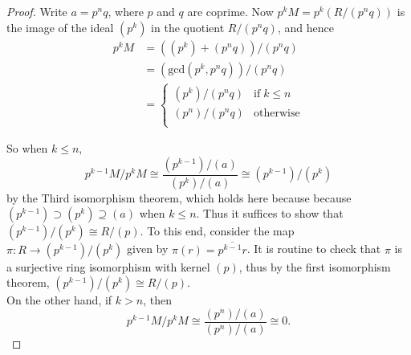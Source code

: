 \documentclass{article}
\begin{document}
  \begin{proof}
    Write $a=p^nq$, where $p$ and $q$ are coprime. Now
    $p^kM=p^k(R/(p^nq))$ is the image of the ideal $(p^k)$ in the quotient
    $R/(p^nq)$, and hence
    \begin{align*}
      p^kM &=((p^k)+(p^nq))/(p^nq)\\
      &=(\text{gcd}(p^k,p^nq))/(p^nq)\\
      &=
      \begin{cases}
        (p^k)/(p^nq) &\text{if}\; k\leq n\\
        (p^n)/(p^nq) &\text{otherwise}\\
      \end{cases}
    \end{align*}

    So when $k\leq n$,
    \[p^{k-1}M/p^kM \cong\frac{(p^{k-1})/(a)}{(p^k)/(a)}
    \cong(p^{k-1})/(p^k)\]
    by the Third isomorphism theorem, which holds here because because
    $(p^{k-1})\supset(p^k)\supseteq(a)$ when $k\leq n$. Thus it suffices to
    show that $(p^{k-1})/(p^k) \cong R/(p)$. To this end, consider the
    map $\pi:R\rightarrow(p^{k-1})/(p^k)$ given by
    $\pi(r)=\overline{p^{k-1}r}$. It is routine to check that $\pi$ is a
    surjective ring isomorphism with kernel $(p)$, thus by the first
    isomorphism theorem, $(p^{k-1})/(p^k) \cong R/(p)$. \\

    On the other hand, if $k>n$, then
    \[p^{k-1}M/p^kM \cong\frac{(p^n)/(a)}{(p^n)/(a)} \cong0.\]
  \end{proof}
\end{document}
